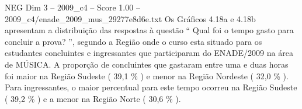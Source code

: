 \begin{textsample}{NEG Dim 3 – 2009\_c4 – Score 1.00 – 2009\_c4/enade\_2009\_mus\_29277e8d6e.txt}
Os Gráficos 4.18a e 4.18b apresentam a distribuição das respostas à questão “ Qual foi o tempo gasto para concluir a prova? ”, segundo a Região onde o curso esta situado para os estudantes concluintes e ingressantes que participaram do ENADE/2009 na área de MÚSICA.
A proporção de concluintes que gastaram entre uma e duas horas foi maior na Região Sudeste ( 39,1 \% ) e menor na Região Nordeste ( 32,0 \% ).
Para ingressantes, o maior percentual para este tempo ocorreu na Região Sudeste ( 39,2 \% ) e a menor na Região Norte ( 30,6 \% ).

\end{textsample}
